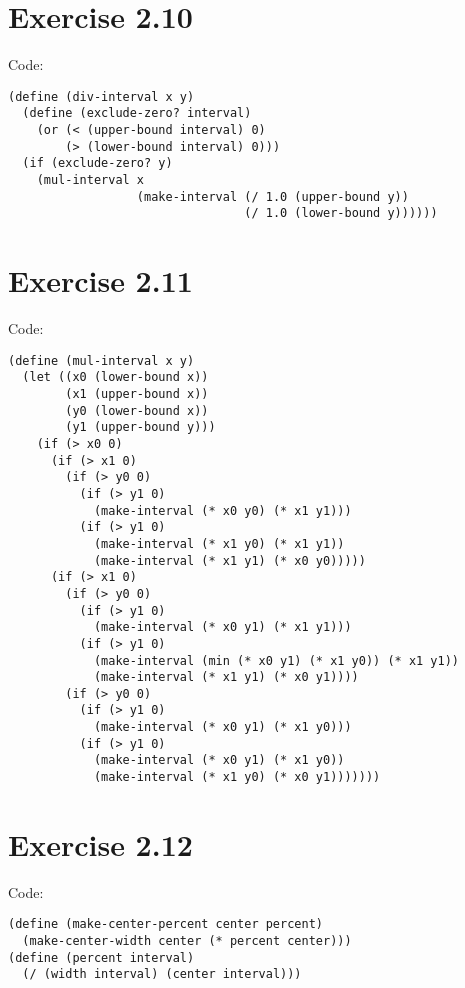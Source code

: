 \documentclass[../main.tex]{subfiles}
\begin{document}
\section{Exercise 2.10}

Code:

\begin{lstlisting}
(define (div-interval x y)
  (define (exclude-zero? interval)
    (or (< (upper-bound interval) 0)
        (> (lower-bound interval) 0)))
  (if (exclude-zero? y)
    (mul-interval x
                  (make-interval (/ 1.0 (upper-bound y))
                                 (/ 1.0 (lower-bound y))))))
\end{lstlisting}

\section{Exercise 2.11}

Code:

\begin{lstlisting}
(define (mul-interval x y)
  (let ((x0 (lower-bound x))
        (x1 (upper-bound x))
        (y0 (lower-bound x))
        (y1 (upper-bound y)))
    (if (> x0 0)
      (if (> x1 0)
        (if (> y0 0)
          (if (> y1 0)
            (make-interval (* x0 y0) (* x1 y1)))
          (if (> y1 0)
            (make-interval (* x1 y0) (* x1 y1))
            (make-interval (* x1 y1) (* x0 y0)))))
      (if (> x1 0)
        (if (> y0 0)
          (if (> y1 0)
            (make-interval (* x0 y1) (* x1 y1)))
          (if (> y1 0)
            (make-interval (min (* x0 y1) (* x1 y0)) (* x1 y1))
            (make-interval (* x1 y1) (* x0 y1))))
        (if (> y0 0)
          (if (> y1 0)
            (make-interval (* x0 y1) (* x1 y0)))
          (if (> y1 0)
            (make-interval (* x0 y1) (* x1 y0))
            (make-interval (* x1 y0) (* x0 y1)))))))
\end{lstlisting}

\section{Exercise 2.12}

Code:

\begin{lstlisting}
(define (make-center-percent center percent)
  (make-center-width center (* percent center)))
(define (percent interval)
  (/ (width interval) (center interval)))
\end{lstlisting}
\end{document}
